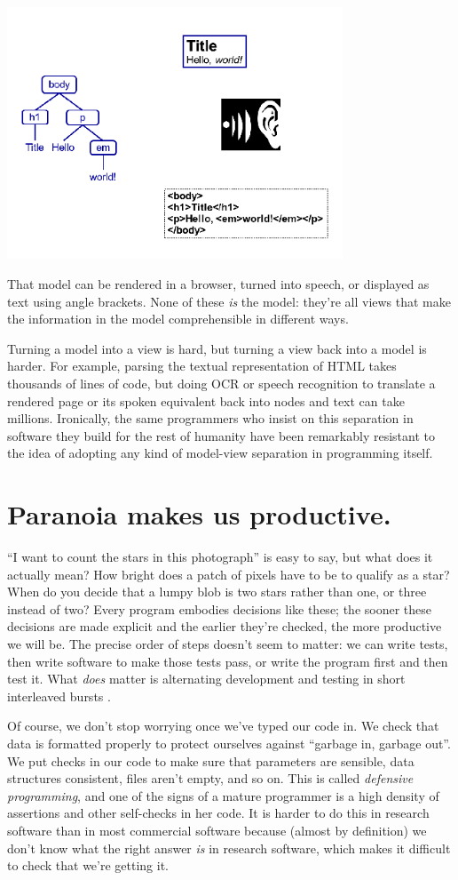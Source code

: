 \documentclass[10pt,letterpaper]{article}
\newcommand{\rulemajor}[1]{\section{#1}}
\begin{document}
\includegraphics[width=10.0cm]{modelview.png}

\noindent
That model can be rendered in a browser, turned into speech, or displayed as
text using angle brackets.  None of these \emph{is} the model: they're all views
that make the information in the model comprehensible in different ways.

Turning a model into a view is hard, but turning a view back into a model is
harder.  For example, parsing the textual representation of HTML takes thousands
of lines of code, but doing OCR or speech recognition to translate a rendered
page or its spoken equivalent back into nodes and text can take millions.
Ironically, the same programmers who insist on this separation in software they
build for the rest of humanity have been remarkably resistant to the idea of
adopting any kind of model-view separation in programming itself.

\rulemajor{Paranoia makes us productive.}

``I want to count the stars in this photograph'' is easy to say, but what does
it actually mean?  How bright does a patch of pixels have to be to qualify as a
star?  When do you decide that a lumpy blob is two stars rather than one, or
three instead of two?  Every program embodies decisions like these; the sooner
these decisions are made explicit and the earlier they're checked, the more
productive we will be.  The precise order of steps doesn't seem to matter: we
can write tests, then write software to make those tests pass, or write the
program first and then test it.  What \emph{does} matter is alternating
development and testing in short interleaved bursts \cite{Fucc2017}.

Of course, we don't stop worrying once we've typed our code in.  We check that
data is formatted properly to protect ourselves against ``garbage in, garbage
out''.  We put checks in our code to make sure that parameters are sensible,
data structures consistent, files aren't empty, and so on.  This is called
\emph{defensive programming}, and one of the signs of a mature programmer is a
high density of assertions and other self-checks in her code.  It is harder to
do this in research software than in most commercial software because (almost by
definition) we don't know what the right answer \emph{is} in research software,
which makes it difficult to check that we're getting it.
\end{document}

